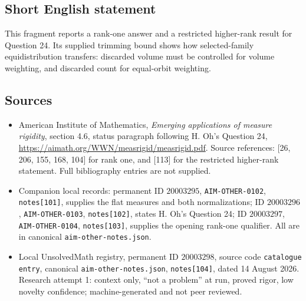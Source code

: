 \documentclass[11pt]{article}
\begin{document}
\subsection{Short English statement}
This fragment reports a rank-one answer and a restricted higher-rank result for Question 24. Its supplied trimming bound shows how selected-family equidistribution transfers: discarded volume must be controlled for volume weighting, and discarded count for equal-orbit weighting.
\subsection{Sources}
\begin{itemize}
\item American Institute of Mathematics, \emph{Emerging applications of measure rigidity}, section 4.6, status paragraph following H. Oh's Question 24, \url{https://aimath.org/WWN/measrigid/measrigid.pdf}. Source references: [26, 206, 155, 168, 104] for rank one, and [113] for the restricted higher-rank statement. Full bibliography entries are not supplied.
\item Companion local records: permanent ID $20003295$, \texttt{AIM-OTHER-0102}, \texttt{notes[101]}, supplies the flat measures and both normalizations; ID $20003296$, \texttt{AIM-OTHER-0103}, \texttt{notes[102]}, states H. Oh's Question 24; ID $20003297$, \texttt{AIM-OTHER-0104}, \texttt{notes[103]}, supplies the opening rank-one qualifier. All are in canonical \texttt{aim-other-notes.json}.
\item Local UnsolvedMath registry, permanent ID $20003298$, source code \texttt{catalogue entry}, canonical \texttt{aim-other-notes.json}, \texttt{notes[104]}, dated 14 August 2026. Research attempt 1: context only, ``not a problem'' at run, proved rigor, low novelty confidence; machine-generated and not peer reviewed.
\end{itemize}
\end{document}
